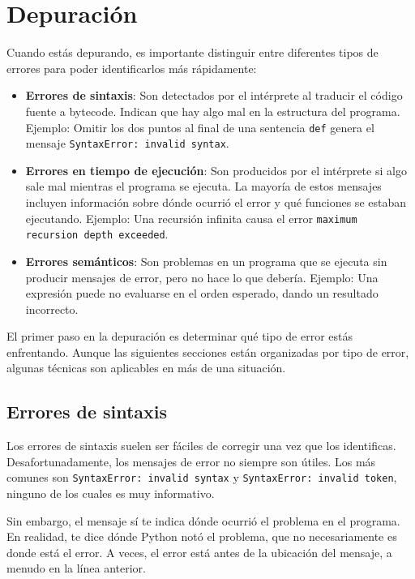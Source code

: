 \appendix
\chapter{Depuración}

Cuando estás depurando, es importante distinguir entre diferentes tipos de errores para poder identificarlos más rápidamente:

\begin{itemize}
    \item \textbf{Errores de sintaxis}: Son detectados por el intérprete al traducir el código fuente a bytecode. Indican que hay algo mal en la estructura del programa. Ejemplo: Omitir los dos puntos al final de una sentencia \texttt{def} genera el mensaje \texttt{SyntaxError: invalid syntax}.
    
    \item \textbf{Errores en tiempo de ejecución}: Son producidos por el intérprete si algo sale mal mientras el programa se ejecuta. La mayoría de estos mensajes incluyen información sobre dónde ocurrió el error y qué funciones se estaban ejecutando. Ejemplo: Una recursión infinita causa el error \texttt{maximum recursion depth exceeded}.
    
    \item \textbf{Errores semánticos}: Son problemas en un programa que se ejecuta sin producir mensajes de error, pero no hace lo que debería. Ejemplo: Una expresión puede no evaluarse en el orden esperado, dando un resultado incorrecto.
\end{itemize}

El primer paso en la depuración es determinar qué tipo de error estás enfrentando. Aunque las siguientes secciones están organizadas por tipo de error, algunas técnicas son aplicables en más de una situación.

\section{Errores de sintaxis}

Los errores de sintaxis suelen ser fáciles de corregir una vez que los identificas. Desafortunadamente, los mensajes de error no siempre son útiles. Los más comunes son \texttt{SyntaxError: invalid syntax} y \texttt{SyntaxError: invalid token}, ninguno de los cuales es muy informativo.

Sin embargo, el mensaje sí te indica dónde ocurrió el problema en el programa. En realidad, te dice dónde Python notó el problema, que no necesariamente es donde está el error. A veces, el error está antes de la ubicación del mensaje, a menudo en la línea anterior.

